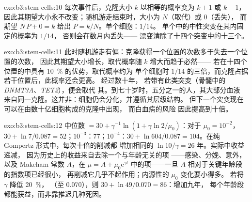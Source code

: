 \begin{solution}{exo:b3:stem-cells:10}
每次事件后，克隆大小 $k$ 以相等的概率变为 $k + 1$ 或 $k - 1$，
因此其期望大小永不改变；随机游走结束时，大小为 $N$（取代）或 $0$（丢失），
而期望 $N\,P + 0 = k$ 给出 $P = k/N$。单个细胞：$1/14$。
单个中的中性突变在其内固定的概率为 $1/14$，
否则会在数月内丢失——
漂变清除了十四个突变中的十三个。
\end{solution}

\begin{solution}{exo:b3:stem-cells:11}
此时随机游走有偏：克隆获得一个位置的次数多于失去一个位置的次数，
因此其期望大小增长，取代概率随 $k$ 增大而趋于必然——
若在十四个位置的中具有 \qty{10}{\%} 的优势，取代概率约为
单个细胞时 $1/14$ 的三倍，而克隆占据若干位置后，此概率还会更高。
经过数十年，
若带有此类突变（骨髓中的 \emph{DNMT3A}、\emph{TET2}），便会取代
其。到七十岁时，五分之一的人，其大部分血液
来自同一克隆。这并非：细胞仍会分化，并遵循其层级结构。
但下一个突变现在可以在由数十亿细胞构成的克隆中出现，
而白血病的风险
因此提高到十倍。
\end{solution}

\begin{solution}{exo:b3:stem-cells:12}
中位数 $= 30 + \gamma^{-1}\ln(1 + \gamma\ln 2/\mu_{0})$：对于 $\mu_{0} =
10^{-2}$，$30 + \ln 7/0.087 = 52$；$10^{-3}$：77；$10^{-4}$：$30 +
\ln 604/0.087 = 104$。在纯 Gompertz 形式中，每次十倍的削减都
增加相同的 $\ln 10/\gamma = 26$ 年。实际中收益递减，
因为历史上的收益来自去除一个与年龄无关的项
——感染、分娩、意外，以及 Makeham 常数 $A$，在 $\mu = A
+ \mu_{0}\mathrm{e}^{\gamma t}$ 中的项——一旦 $A$ 相对于关键年龄段的指数项已经很小，
再削减它几乎不起作用；内源性的 $\mu_{0}$ 变化要小得多。
若将 $\gamma$ 降低 \qty{20}{\%}，
（至 $0.070$），则 $30 + \ln 49/0.070 = 86$：增加九年，
每个年龄段都能获益，而非靠推迟几种死因。
\end{solution}

